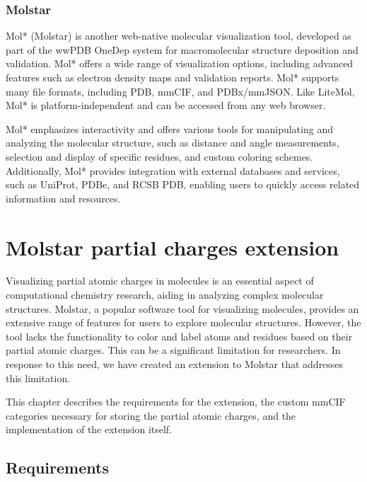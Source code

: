 \documentclass[
  digital,     %
  oneside,     %
  nosansbold,  %
  nocolorbold, %
  lof,         %
  lot,         %
]{fithesis4}
\begin{document}
\subsection{Molstar}
\label{subsection:molstar}

\parencite{sehnal-molstar}

Mol* (Molstar) is another web-native molecular visualization tool, developed as part of the wwPDB OneDep system for macromolecular structure deposition and validation. Mol* offers a wide range of visualization options, including advanced features such as electron density maps and validation reports. Mol* supports many file formats, including PDB, mmCIF, and PDBx/mmJSON. Like LiteMol, Mol* is platform-independent and can be accessed from any web browser.

Mol* emphasizes interactivity and offers various tools for manipulating and analyzing the molecular structure, such as distance and angle measurements, selection and display of specific residues, and custom coloring schemes. Additionally, Mol* provides integration with external databases and services, such as UniProt, PDBe, and RCSB PDB, enabling users to quickly access related information and resources.

\chapter{Molstar partial charges extension}
\label{chapter:molstar_partial_charges_extension}

Visualizing partial atomic charges in molecules is an essential aspect of computational chemistry research, aiding in analyzing complex molecular structures. Molstar, a popular software tool for visualizing molecules, provides an extensive range of features for users to explore molecular structures. However, the tool lacks the functionality to color and label atoms and residues based on their partial atomic charges. This can be a significant limitation for researchers. In response to this need, we have created an extension to Molstar that addresses this limitation.

This chapter describes the requirements for the extension, the custom mmCIF categories necessary for storing the partial atomic charges, and the implementation of the extension itself.

\section{Requirements}
\label{section:requirements}
\end{document}
